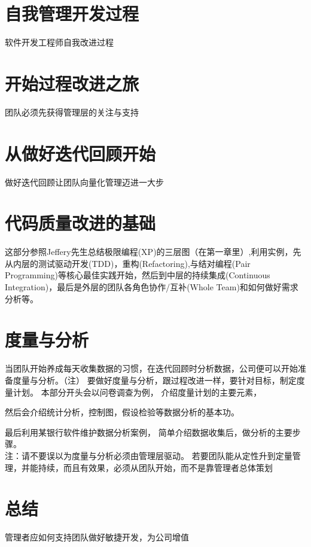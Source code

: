 \documentclass{book}        %
\begin{document}
\part{自我管理开发过程}软件开发工程师自我改进过程\\



\part{开始过程改进之旅}团队必须先获得管理层的关注与支持\\

\part{从做好迭代回顾开始 }做好迭代回顾让团队向量化管理迈进一大步\\

\part{代码质量改进的基础}这部分参照Jeffery先生总结极限编程(XP)的三层图（在第一章里）,利用实例，先从内层的测试驱动开发(TDD)，重构(Refactoring),与结对编程(Pair Programming)等核心最佳实践开始，然后到中层的持续集成(Continuous Integration)，最后是外层的团队各角色协作/互补(Whole Team)和如何做好需求分析等。 \\



\part{度量与分析}当团队开始养成每天收集数据的习惯，在迭代回顾时分析数据，公司便可以开始准备度量与分析。（注）
要做好度量与分析，跟过程改进一样，要针对目标，制定度量计划。
本部分开头会以问卷调查为例，
介绍度量计划的主要元素，

然后会介绍统计分析，控制图，假设检验等数据分析的基本功。

最后利用某银行软件维护数据分析案例，
简单介绍数据收集后，做分析的主要步骤。\\


注：请不要误以为度量与分析必须由管理层驱动。
若要团队能从定性升到定量管理，并能持续，而且有效果，必须从团队开始，而不是靠管理者总体策划
\\



\part{总结} 管理者应如何支持团队做好敏捷开发，为公司增值\\
\end{document}
